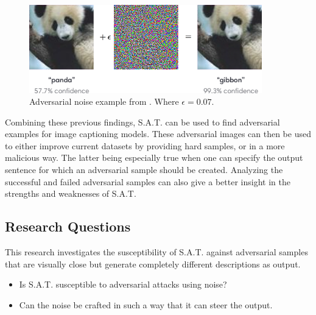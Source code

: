 \begin{figure}[h]
    \centering
    \includegraphics[width=0.9\textwidth]{figures/adversarial_img_1.png}
    \caption{Adversarial noise example from \protect\cite{goodfellow2015explaining}. Where $\epsilon=0.07$.}
    \label{adv_gibbon}
\end{figure}

Combining these previous findings, S.A.T. can be used to find adversarial examples for image captioning models. These adversarial images can then be used to either improve current datasets by providing hard samples, or in a more malicious way. The latter being especially true when one can specify the output sentence for which an adversarial sample should be created. 
Analyzing the successful and failed adversarial samples can also give a better insight in the strengths and weaknesses of S.A.T.

\subsection*{Research Questions}
This research investigates the susceptibility of S.A.T. against adversarial samples that are visually close but generate completely different descriptions as output.
\begin{itemize}
    \item Is S.A.T. susceptible to adversarial attacks using noise?
    \item Can the noise be crafted in such a way that it can steer the output.
\end{itemize}
